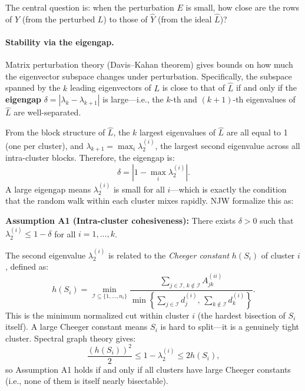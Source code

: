 \documentclass[11pt]{article}
\theoremstyle{plain}
\theoremstyle{definition}
\begin{document}
The central question is: when the perturbation $E$ is small, how close are the rows of $Y$ (from the perturbed $L$) to those of $\hat{Y}$ (from the ideal $\hat{L}$)?

\paragraph{Stability via the eigengap.} Matrix perturbation theory (Davis--Kahan theorem) gives bounds on how much the eigenvector subspace changes under perturbation. Specifically, the subspace spanned by the $k$ leading eigenvectors of $L$ is close to that of $\hat{L}$ if and only if the \textbf{eigengap} $\delta = |\lambda_k - \lambda_{k+1}|$ is large---i.e., the $k$-th and $(k+1)$-th eigenvalues of $\hat{L}$ are well-separated.

From the block structure of $\hat{L}$, the $k$ largest eigenvalues of $\hat{L}$ are all equal to 1 (one per cluster), and $\lambda_{k+1} = \max_i \lambda_2^{(i)}$, the largest second eigenvalue across all intra-cluster blocks. Therefore, the eigengap is:
\begin{equation}
    \delta = |1 - \max_i \lambda_2^{(i)}|.
\end{equation}
A large eigengap means $\lambda_2^{(i)}$ is small for all $i$---which is exactly the condition that the random walk within each cluster mixes rapidly. NJW formalize this as:

\begin{keybox}
\textbf{Assumption A1 (Intra-cluster cohesiveness):} There exists $\delta > 0$ such that $\lambda_2^{(i)} \leq 1 - \delta$ for all $i = 1, \ldots, k$.
\end{keybox}

The second eigenvalue $\lambda_2^{(i)}$ is related to the \emph{Cheeger constant} $h(S_i)$ of cluster $i$, defined as:
\begin{equation}
    h(S_i) = \min_{\mathcal{I} \subseteq \{1,\ldots,n_i\}} \frac{\sum_{j \in \mathcal{I},\, k \notin \mathcal{I}} A_{jk}^{(ii)}}{\min\left\{\sum_{j \in \mathcal{I}} d_j^{(i)},\, \sum_{k \notin \mathcal{I}} d_k^{(i)}\right\}}.
    \label{eq:cheeger}
\end{equation}
This is the minimum normalized cut within cluster $i$ (the hardest bisection of $S_i$ itself). A large Cheeger constant means $S_i$ is hard to split---it is a genuinely tight cluster. Spectral graph theory gives:
\begin{equation}
    \frac{(h(S_i))^2}{2} \leq 1 - \lambda_2^{(i)} \leq 2h(S_i),
\end{equation}
so Assumption A1 holds if and only if all clusters have large Cheeger constants (i.e., none of them is itself nearly bisectable).
\end{document}
